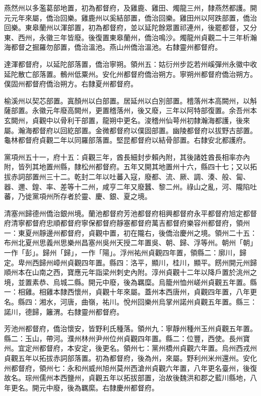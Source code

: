 \begin{pinyinscope}
 燕然州以多濫葛部地置，初為都督府，及雞鹿、雞田、燭龍三州，隸燕然都護。開元元年來屬，僑治回樂。雞鹿州以奚結部置，僑治回樂。雞田州以阿跌部置，僑治回樂。東皋蘭州以渾部置，初為都督府，並以延陀餘眾置祁連州，後罷都督，又分東、西州，永徽三年皆廢。後復置東皋蘭州，僑治鳴沙。燭龍州貞觀二十三年析瀚海都督之掘羅勿部置，僑治溫池。燕山州僑治溫池。右隸靈州都督府。



 達渾都督府，以延陀部落置，僑治寧朔。領州五：姑衍州步訖若州嵠彈州永徽中收延陀散亡部落置。鶻州低粟州。安化州都督府僑治朔方。寧朔州都督府僑治朔方。僕固州都督府僑治朔方。右隸夏州都督府。



 榆溪州以契芯部置。寘顏州以白部置。居延州以白別部置。稽落州本高闕州，以斛薩部置。永徽元年廢高闕州，更置稽落州，後又廢，三年以阿特部復置。余吾州本玄闕州，貞觀中以骨利干部置，龍朔中更名。浚稽州仙萼州初隸瀚海都護，後來屬。瀚海都督府以回紇部置。金微都督府以僕固部置。幽陵都督府以拔野古部置。龜林都督府貞觀二年以同羅部落置。堅昆都督府以結骨部置。右隸安北都護府。



 黨項州五十一，府十五：貞觀三年，酋長細封步賴內附，其後諸姓酋長相率亦內附，皆列其地置州縣，隸松州都督府。五年又開其地置州十六，縣四十七；又以拓拔赤詞部置州三十二。乾封二年以吐蕃入寇，廢都、流、厥、調、湊、般、匐、器、邇、鍠、率、差等十二州，咸亨二年又廢蠶、黎二州。祿山之亂，河、隴陷吐蕃，乃徙黨項州所存者於靈、慶、銀、夏之境。



 清塞州歸德州僑治銀州境。蘭池都督府芳池都督府相興都督府永平都督府旭定都督府清寧都督府忠順都督府寧保都督府靜塞都督府萬吉都督府樂容州都督府，領州一：東夏州靜邊州都督府，貞觀中置，初在隴右，後僑治慶州之境。領州二十五：布州北夏州思義州思樂州昌塞州吳州天授二年置吳、朝、歸、浮等州。朝州「朝」一作「彭」。歸州「歸」，一作「陽」。浮州祐州貞觀四年置，領縣二：廓川，歸定。卑州西歸州嶂州貞觀四年置。縣四：洛平，顯川，桂川，顯平。餝州開元州歸順州本在山南之西，寶應元年詣梁州刺史內附。淳州貞觀十二年以降戶置於洮州之境，並置素恭、烏城二縣。開元中廢，後為羈糜。烏籠州恤州嵯州貞觀五年置。縣一：相雞。相雞本隸西懷州，貞觀十年來屬。蓋州本西唐州，貞觀四年置，八年更名。縣四：湘水，河唐，曲嶺，祐川。悅州回樂州烏掌州諾州貞觀五年置。縣三：諾川，德歸，籬渭。右隸靈州都督府。



 芳池州都督府，僑治懷安，皆野利氏種落。領州九：寧靜州種州玉州貞觀五年置。縣二：玉山，帶河。濮州林州尹州位州貞觀四年置。縣二：位豐，西使。長州寶州。宜定州都督府，本安定，後更名。領州七：黨州橋州貞觀六年置。烏州西戎州貞觀五年以拓拔赤詞部落置。初為都督府，後為州，來屬。野利州米州還州。安化州都督府，領州七：永和州威州旭州莫州西滄州貞觀六年置，八年更名臺州，後復故名。琮州儒州本西鹽州，貞觀五年以拓拔部置，治故後魏洪和郡之藍川縣地，八年更名。開元中廢，後為羈縻。右隸慶州都督府。




\end{pinyinscope}
